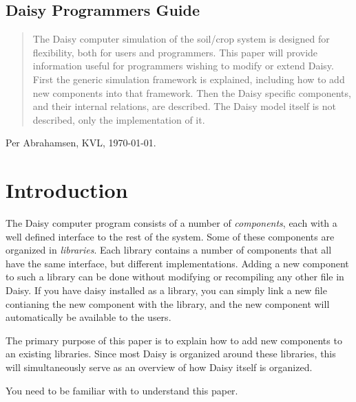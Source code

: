 \documentclass{article}
\newcommand{\cplusplus}%
{{\leavevmode{\rm{\hbox{C\hskip -0.1ex\raise 0.5ex\hbox{\tiny ++}}}}}}
\begin{document}
\begin{center}
  \section*{Daisy Programmers Guide}
\end{center}

\begin{abstract}
  The Daisy computer simulation of the soil/crop system is designed
  for flexibility, both for users and programmers.  This paper will
  provide information useful for programmers wishing to modify or
  extend Daisy.  First the generic simulation framework is explained,
  including how to add new components into that framework.  Then the
  Daisy specific components, and their internal relations, are
  described.  The Daisy model itself is not described, only the
  implementation of it.
\end{abstract}

\begin{center}
  \begin{it}
    Per Abrahamsen, KVL, \today{}.
  \end{it}
\end{center}

\pagebreak{}
\tableofcontents{}
\pagebreak{}

\section{Introduction}

The Daisy computer program consists of a number of \emph{components},
each with a well defined interface to the rest of the system.  Some of
these components are organized in \emph{libraries}.  Each library
contains a number of components that all have the same interface, but
different implementations.  Adding a new component to such a library
can be done without modifying or recompiling any other file in Daisy.
If you have daisy installed as a library, you can simply link a new
file contianing the new component with the library, and the new
component will automatically be available to the users.

The primary purpose of this paper is to explain how to add new
components to an existing libraries.  Since most Daisy is organized
around these libraries, this will simultaneously serve as an overview
of how Daisy itself is organized. 

You need to be familiar with \cplusplus{} to understand this paper.
\end{document}
